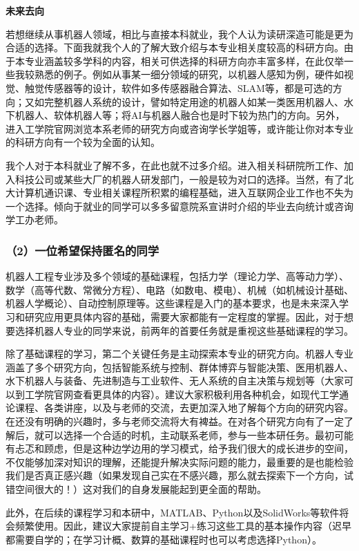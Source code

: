 \documentclass[11pt,oneside]{book}
\begin{document}
\textbf{未来去向}

若想继续从事机器人领域，相比与直接本科就业，我个人认为读研深造可能是更为合适的选择。下面我就我个人的了解大致介绍与本专业相关度较高的科研方向。由于本专业涵盖较多学科的内容，相关可供选择的科研方向亦丰富多样，在此仅举一些我较熟悉的例子。例如从事某一细分领域的研究，以机器人感知为例，硬件如视觉、触觉传感器等的设计，软件如多传感器融合算法、SLAM等，都是可选的方向；又如完整机器人系统的设计，譬如特定用途的机器人如某一类医用机器人、水下机器人、软体机器人等；将AI与机器人融合也是时下较为热门的方向。另外，进入工学院官网浏览本系老师的研究方向或咨询学长学姐等，或许能让你对本专业的科研方向有一个较为全面的认知。

我个人对于本科就业了解不多，在此也就不过多介绍。进入相关科研院所工作、加入科技公司或某些大厂的机器人研发部门，一般是较为对口的选择。当然，有了北大计算机通识课、专业相关课程所积累的编程基础，进入互联网企业工作也不失为一个选择。倾向于就业的同学可以多多留意院系宣讲时介绍的毕业去向统计或咨询学工办老师。

\subsubsection{（2）一位希望保持匿名的同学}
机器人工程专业涉及多个领域的基础课程，包括力学（理论力学、高等动力学）、数学（高等代数、常微分方程）、电路（如数电、模电）、机械（如机械设计基础、机器人学概论）、自动控制原理等。这些课程是入门的基本要求，也是未来深入学习和研究应用更具体内容的基础，需要大家都能有一定程度的掌握。因此，对于想要选择机器人专业的同学来说，前两年的首要任务就是重视这些基础课程的学习。

除了基础课程的学习，第二个关键任务是主动探索本专业的研究方向。机器人专业涵盖了多个研究方向，包括智能系统与控制、群体博弈与智能决策、医用机器人、水下机器人与装备、先进制造与工业软件、无人系统的自主决策与规划等（大家可以到工学院官网查看更具体的内容）。建议大家积极利用各种机会，如现代工学通论课程、各类讲座，以及与老师的交流，去更加深入地了解每个方向的研究内容。在还没有明确的兴趣时，多与老师交流将大有裨益。在对各个研究方向有了一定了解后，就可以选择一个合适的时机，主动联系老师，参与一些本研任务。最初可能有忐忑和顾虑，但是这种边学边用的学习模式，给予我们很大的成长进步的空间，不仅能够加深对知识的理解，还能提升解决实际问题的能力，最重要的是也能检验我们是否真正感兴趣（如果发现自己实在不感兴趣，那么就去探索下一个方向，试错空间很大的！）这对我们的自身发展能起到更全面的帮助。

此外，在后续的课程学习和本研中，MATLAB、Python以及SolidWorks等软件将会频繁使用。因此，建议大家提前自主学习+练习这些工具的基本操作内容（迟早都需要自学的；在学习计概、数算的基础课程时也可以考虑选择Python）。
\end{document}
